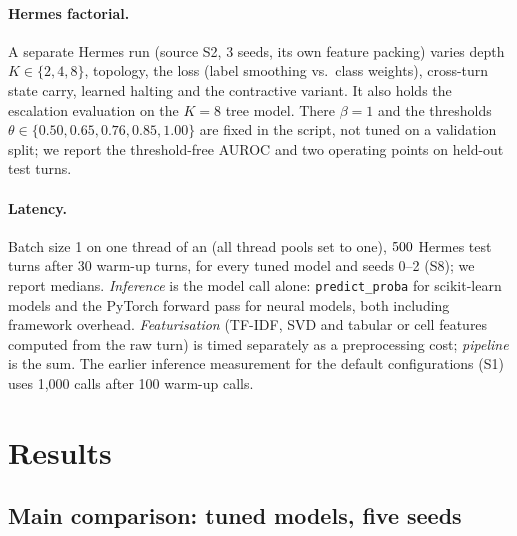 \documentclass[10pt]{article}
\begin{document}
\paragraph{Hermes factorial.} A separate Hermes run (source S2, 3 seeds, its own feature packing) varies depth $K\in\{2,4,8\}$, topology, the loss (label smoothing vs.\ class weights), cross-turn state carry, learned halting and the contractive variant. It also holds the escalation evaluation on the $K{=}8$ tree model. There $\beta{=}1$ and the thresholds $\theta\in\{0.50,0.65,0.76,0.85,1.00\}$ are fixed in the script, not tuned on a validation split; we report the threshold-free AUROC and two operating points on held-out test turns.
\paragraph{Latency.} Batch size 1 on one thread of an \numCpuName{} (all thread pools set to one), $500$ Hermes test turns after 30 warm-up turns, for every tuned model and seeds 0--2 (S8); we report medians. \emph{Inference} is the model call alone: \texttt{predict\_\allowbreak{}proba} for scikit-learn models and the PyTorch forward pass for neural models, both including framework overhead. \emph{Featurisation} (TF-IDF, SVD and tabular or cell features computed from the raw turn) is timed separately as a preprocessing cost; \emph{pipeline} is the sum. The earlier inference measurement for the default configurations (S1) uses 1{,}000 calls after 100 warm-up calls.

\section{Results}\label{sec:results}
\subsection{Main comparison: tuned models, five seeds}\label{sec:main-comparison}
\begin{table}[t]
\centering
\scriptsize
\setlength{\tabcolsep}{3pt}
\caption{Main result. Test top-1 accuracy (\%, mean $\pm$ SD over five seeds) of every model after the equal-budget search with multi-seed selection, and the paired difference tree GNCA minus model ($\Delta$, pp; seed-clustered bootstrap over test turns; $^{\dagger}$: Holm-adjusted $p<0.05$ within the model's family). Pooled: DerSimonian--Laird random-effects estimate over the four benchmarks with 95\% CI. Families: primary (RF, HGB, MLP; 12 tests), secondary (RF$^\ast$, HGB$^\ast$; 8), new baselines ($k$-NN, Transformer, untied GNN; 12). BFCL: the turn-level routing split built from public BFCL v3 files (Section~\ref{sec:protocol}), not the official BFCL v4 harness of Section~\ref{sec:bfcl-official}. Source S8 (Table~\ref{tab:sources}).}
\label{tab:rig-main}

\end{table}
\end{document}

